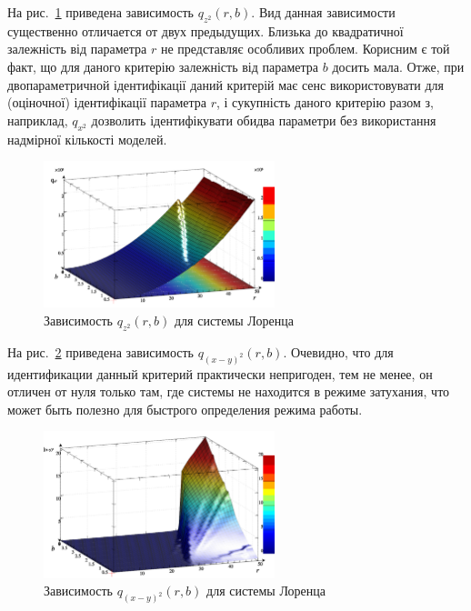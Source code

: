 На рис.~\ref{atu:f:lor_qz2_r_b} приведена зависимость
$q_{z^2}(r,b)$.
Вид данная зависимости существенно отличается от двух предыдущих.
%
Близька до квадратичної залежність від параметра $r$ не представляє особливих
проблем. Корисним є той факт, що для даного критерію залежність від параметра $b$
досить мала. Отже, при двопараметричной ідентифікації даний критерій має
сенс використовувати для (оціночної) ідентифікації параметра $r$, і
сукупність даного критерію разом з, наприклад, $q_{x^2}$ дозволить
ідентифікувати обидва параметри без використання надмірної кількості моделей.

\begin{figure}[ht!]
  \centerline{  \includegraphics[width=0.60\textwidth]{p/cha/lor/q2d/lor_qz2_r_b.png}  }
  \caption{Зависимость $q_{z^2}(r,b)$ для системы Лоренца}
  \label{atu:f:lor_qz2_r_b}
\end{figure}

На рис.~\ref{atu:f:lor_qxmy2_r_b} приведена зависимость
$q_{(x-y)^2}(r,b)$.
Очевидно, что для идентификации данный критерий
практически непригоден, тем не менее,
он отличен от нуля только там, где системы не
находится в режиме затухания, что может быть полезно
для быстрого определения режима работы.

\begin{figure}[ht!]
  \centerline{  \includegraphics[width=0.60\textwidth]{p/cha/lor/q2d/lor_qxmy2_r_b.png}  }
  \caption{Зависимость $q_{(x-y)^2}(r,b)$ для системы Лоренца}
  \label{atu:f:lor_qxmy2_r_b}
\end{figure}


